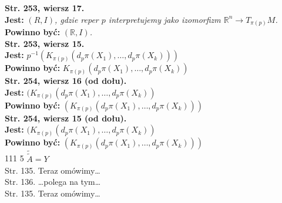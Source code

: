 \documentclass[a4paper,11pt]{article}
\newcommand{\mb}{\mathbb}
\newcommand{\ra}{\rightarrow}
\newcommand{\ld}{\ldots}
\newcommand{\R}{\mb{R}}
\newcommand{\wt}{\widetilde}
\newcommand{\tb}{\textbf}
\newcommand{\StrWg}[2]{\tb{Str. #1, wiersz #2.}}
\newcommand{\StrWd}[2]{\tb{Str. #1, wiersz #2 (od dołu).}}
\newcommand{\Jest}{\tb{Jest: }}
\newcommand{\Pow}{\tb{Powinno być: }}
\begin{document}
\StrWg{253}{17} \\
\Jest \emph{$( R, I )$, gdzie reper $p$ interpretujemy jako izomorfizm
  $\R^{ n } \ra T_{ \pi( p ) }M$.} \\
\Pow \emph{$( \R, I )$.} \\
\StrWg{253}{15} \\
\Jest $p^{ -1 }( K_{ \pi( p ) }( d_{ p }\pi( X_{ 1 } ), \ld, d_{ p }\pi( X_{ k } ) ) )$ \\
\Pow $K_{ \pi( p ) }( d_{ p }\pi( X_{ 1 } ), \ld, d_{ p }\pi( X_{ k } ) )$ \\
\StrWd{254}{16} \\
\Jest
$( K_{ \pi( p ) }( d_{ p }\pi( X_{ 1 } ), \ld, d_{ p }\pi( X_{ k } )
)$ \\
\Pow $( K_{ \pi( p ) }( d_{ p }\pi( X_{ 1 } ), \ld,
d_{ p }\pi( X_{ k } ) ) )$ \\
\StrWd{254}{15} \\
\Jest $( K_{ \pi( p ) }( d_{ p }\pi( X_{ 1 } ), \ld,
d_{ p }\pi( X_{ k } ) )$ \\
\Pow $( K_{ \pi( p ) }( d_{ p }\pi( X_{ 1 } ), \ld,
d_{ p }\pi( X_{ k } ) ) )$ \\


111 5 $\wt{ \wt{ A } } = Y$ \\
Str. 135. Teraz omówimy\ld \\
Str. 136. \ldots polega na tym\ld \\
Str. 135. Teraz omówimy\ld \\





 {}
\end{document}
